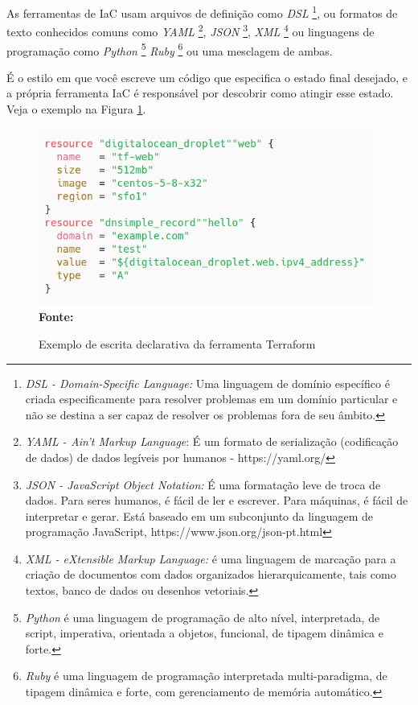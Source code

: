 As ferramentas de IaC usam arquivos de definição como \textit{DSL} 
  \footnote{\textit{DSL - Domain-Specific Language:} Uma linguagem de domínio específico é criada especificamente para resolver problemas em um domínio particular e não se destina a ser capaz de resolver os problemas fora de seu âmbito. }, ou formatos de texto conhecidos comuns como \textit{ YAML} \footnote{\textit{YAML - Ain't  Markup Language}: É um formato de serialização (codificação de dados) de dados legíveis por humanos -  https://yaml.org/ }, \textit{JSON} \footnote{\textit{JSON - JavaScript Object Notation:} É uma formatação leve de troca de dados. Para seres humanos, é fácil de ler e escrever. Para máquinas, é fácil de interpretar e gerar. Está baseado em um subconjunto da linguagem de programação JavaScript, https://www.json.org/json-pt.html}, \textit{XML} \footnote{\textit{XML - eXtensible Markup Language:} é uma linguagem de marcação para a criação de documentos com dados organizados hierarquicamente, tais como textos, banco de dados ou desenhos vetoriais.}
  ou linguagens de programação como \textit{Python} \footnote{\textit{Python} é uma linguagem de programação de alto nível, interpretada, de script, imperativa, orientada a objetos, funcional, de tipagem dinâmica e forte.}  \textit{Ruby} \footnote{\textit{Ruby} é uma linguagem de programação interpretada multi-paradigma, de tipagem dinâmica e forte, com gerenciamento de memória automático.}  ou uma mesclagem de ambas.
 
  É o estilo em que você escreve um código que especifica o estado final desejado, e a própria ferramenta IaC é responsável por descobrir como atingir esse estado. Veja o exemplo na Figura \ref{fig:figura2}.
 
 \begin{figure}[ht]
	\centering	
	\caption[\hspace{0.1cm}Exemplo declarativo]{Exemplo de escrita declarativa da ferramenta Terraform}
	\vspace{-0.4cm}
	\includegraphics[width=0.98\textwidth]{artigo/figuras/terraform-declarative-exemple-01.png}
	 \vspace{-0.2cm}
	\\\textbf{\footnotesize Fonte: \cite{terraform01} }
	\label{fig:figura2}
\end{figure}
\vspace{-0.5cm}
 
